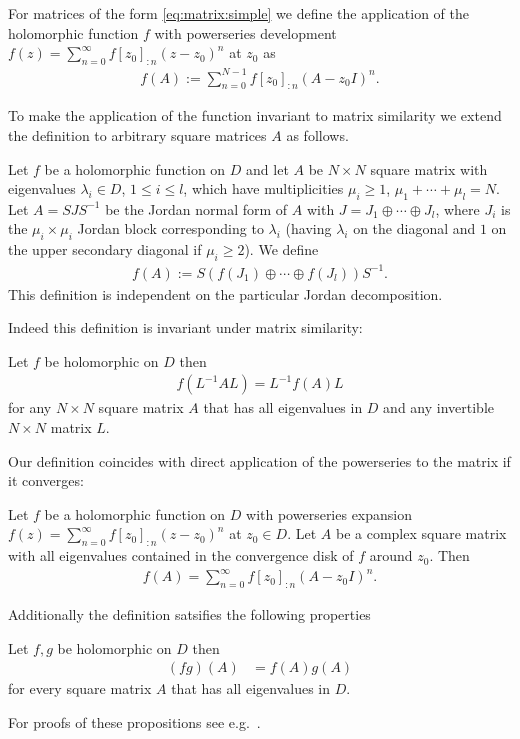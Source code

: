 \documentclass{article}
\numberwithin{equation}{section}
\begin{document}
\begin{sdef}
For matrices of the form \eqref{eq:matrix:simple} we define the
application of the holomorphic function $f$ with powerseries
development $f(z)=\sum_{n=0}^\infty f[z_0]_{:n} (z-z_0)^n$ at
$z_0$ as 
  \begin{align*}
    f(A):=\sum_{n=0}^{N-1} f[z_0]_{:n} (A-z_0 I)^n.
  \end{align*}
\end{sdef}

To make the application of the function invariant to matrix similarity
we extend the definition to arbitrary square matrices $A$ as follows.

\begin{sdef}
  Let $f$ be a holomorphic function on $D$ and let $A$ be $N\times N$ square
  matrix with eigenvalues $\lambda_i\in D$, $1\le i \le l$, which have multiplicities
  $\mu_i\ge 1$, $\mu_1+\dotsb+\mu_l=N$. Let $A=SJS^{-1}$ be the Jordan normal form of $A$ with
  $J=J_1\oplus\dotsb \oplus J_l$, where $J_i$ is the
  $\mu_i\times\mu_i$ Jordan block corresponding to $\lambda_i$ (having
  $\lambda_i$ on the diagonal and $1$ on the upper secondary
  diagonal if $\mu_i\ge 2$). We define
  \begin{align}
    f(A):=S\left( f(J_1)\oplus\dotsb\oplus f(J_l)\right) S^{-1}.
  \end{align}
  This definition is independent on the particular Jordan
  decomposition.
\end{sdef}
Indeed this definition is invariant under matrix similarity:
\begin{wellknown}
  Let $f$ be holomorphic on $D$ then 
  \begin{align}
    f(L^{-1}AL)=L^{-1}f(A)L
  \end{align}
  for any $N\times N$ square matrix $A$ that has all eigenvalues in $D$ and any
  invertible $N\times N$ matrix $L$. 
\end{wellknown}
Our definition coincides with direct application of the powerseries
to the matrix if it converges:
\begin{wellknown}\label{prop:matrixfunction:powerseries}
  Let $f$ be a holomorphic function on $D$ with powerseries expansion
  $f(z)=\sum_{n=0}^\infty f[z_0]_{:n} (z-z_0)^n$ at $z_0\in D$. Let $A$
  be a complex square matrix with all eigenvalues contained in the
  convergence disk of $f$ around $z_0$. Then
  \begin{align*}
    f(A)=\sum_{n=0}^\infty f[z_0]_{:n} (A-z_0 I)^n.
  \end{align*}
\end{wellknown}
Additionally the definition satsifies the following properties
\begin{wellknown}
  Let $f,g$ be holomorphic on $D$ then
  \begin{align}
    (fg)(A)&=f(A)g(A)\label{eq:matrix:function:multiplication}
  \end{align}
  for every square matrix $A$ that has all eigenvalues in $D$.
\end{wellknown}
For proofs of these propositions see e.g.\ \cite{horn:topics}.
\end{document}
